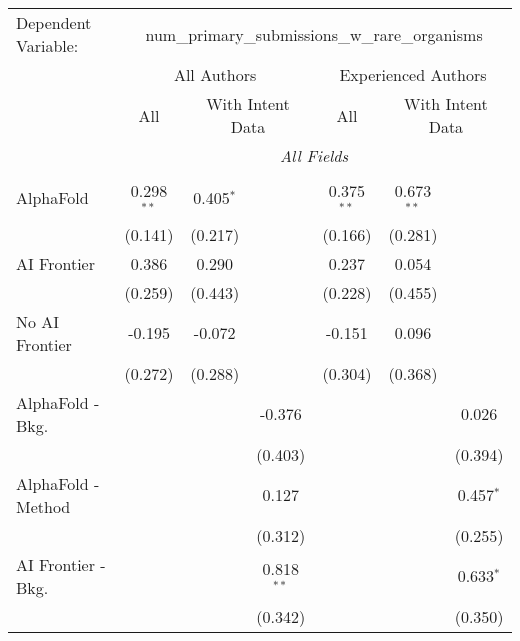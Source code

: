 \begingroup
\centering
\begin{tabular}{lcccccc}
   \tabularnewline \midrule \midrule
   Dependent Variable: & \multicolumn{6}{c}{num\_primary\_submissions\_w\_rare\_organisms}\\
 & \multicolumn{3}{c}{All Authors} & \multicolumn{3}{c}{Experienced Authors} \\
\cmidrule(lr){2-4} \cmidrule(lr){5-7}
 & \multicolumn{1}{c}{All} & \multicolumn{2}{c}{With Intent Data} & \multicolumn{1}{c}{All} & \multicolumn{2}{c}{With Intent Data} \\
\cmidrule(lr){2-2} \cmidrule(lr){3-4} \cmidrule(lr){5-5} \cmidrule(lr){6-7}
 & \multicolumn{6}{c}{\textit{All Fields}} \\ \\
   AlphaFold               & 0.298$^{**}$ & 0.405$^{*}$ &              & 0.375$^{**}$ & 0.673$^{**}$ &   \\   
                           & (0.141)      & (0.217)     &              & (0.166)      & (0.281)      &   \\   
   AI Frontier             & 0.386        & 0.290       &              & 0.237        & 0.054        &   \\   
                           & (0.259)      & (0.443)     &              & (0.228)      & (0.455)      &   \\   
   No AI Frontier          & -0.195       & -0.072      &              & -0.151       & 0.096        &   \\   
                           & (0.272)      & (0.288)     &              & (0.304)      & (0.368)      &   \\   
   AlphaFold - Bkg.        &              &             & -0.376       &              &              & 0.026\\   
                           &              &             & (0.403)      &              &              & (0.394)\\   
   AlphaFold - Method      &              &             & 0.127        &              &              & 0.457$^{*}$\\   
                           &              &             & (0.312)      &              &              & (0.255)\\   
   AI Frontier - Bkg.      &              &             & 0.818$^{**}$ &              &              & 0.633$^{*}$\\   
                           &              &             & (0.342)      &              &              & (0.350)\\   

\end{tabular}
